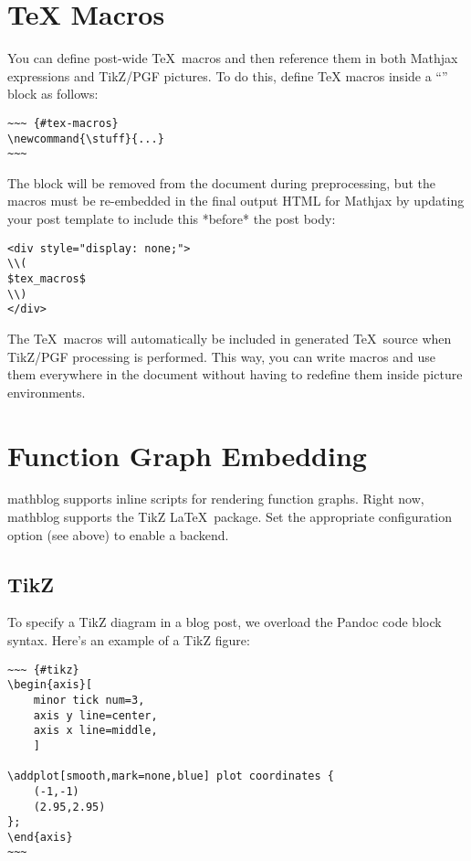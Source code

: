 \documentclass[11pt, letterpaper, oneside, titlepage]{book}
\begin{document}
\section{TeX Macros}

You can define post-wide \TeX\ macros and then reference them in both
Mathjax expressions and TikZ/PGF pictures.  To do this, define \TeX
macros inside a ``'' block as follows:

\begin{verbatim}
~~~ {#tex-macros}
\newcommand{\stuff}{...}
~~~
\end{verbatim}

The block will be removed from the document during preprocessing, but
the macros must be re-embedded in the final output HTML for Mathjax by
updating your post template to include this *before* the post body:

\begin{verbatim}
<div style="display: none;">
\\(
$tex_macros$
\\)
</div>
\end{verbatim}

The \TeX\ macros will automatically be included in generated
\TeX\ source when TikZ/PGF processing is performed.  This way, you can
write macros and use them everywhere in the document without having to
redefine them inside picture environments.

\section{Function Graph Embedding}

mathblog supports inline scripts for rendering function graphs.  Right
now, mathblog supports the TikZ \LaTeX\ package.  Set the appropriate
configuration option (see above) to enable a backend.

\subsection{TikZ}

To specify a TikZ diagram in a blog post, we overload the Pandoc code
block syntax.  Here's an example of a TikZ figure:

\begin{verbatim}
~~~ {#tikz}
\begin{axis}[
    minor tick num=3,
    axis y line=center,
    axis x line=middle,
    ]

\addplot[smooth,mark=none,blue] plot coordinates {
    (-1,-1)
    (2.95,2.95)
};
\end{axis}
~~~
\end{verbatim}
\end{document}
